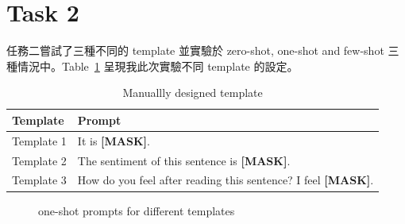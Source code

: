 \documentclass[a4paper,12pt]{article}   %
\begin{document}

\section{Task 2}

	任務二嘗試了三種不同的 template 並實驗於 zero-shot, one-shot and few-shot 三種情況中。Table\ \ref{table:template_prompts} 呈現我此次實驗不同 template 的設定。

\begin{table}[htb]
	\centering	
	\normalsize
    \caption{Manuallly designed template}
    \vspace{0.15\baselineskip}
    \begin{tabularx}{1\textwidth}{@{}l|l@{}}
		\toprule
		\textbf{Template} & \textbf{Prompt} \\
		\midrule
		Template 1   & It is \textbf{[MASK]}. \\
		Template 2   & The sentiment of this sentence is \textbf{[MASK]}. \\
		Template 3   & How do you feel after reading this sentence? I feel \textbf{[MASK]}.  \\  %
		\bottomrule
	\end{tabularx}
	\label{table:template_prompts}
    \vspace{0.15\baselineskip}
\end{table}

\begin{figure}[htb]
  \vspace{0.1\baselineskip}  
  \centering  
    \caption{one-shot prompts for different templates}
    \label{fig:one_shot}
  \vspace{0.1\baselineskip}
\end{figure}	
\end{document}
